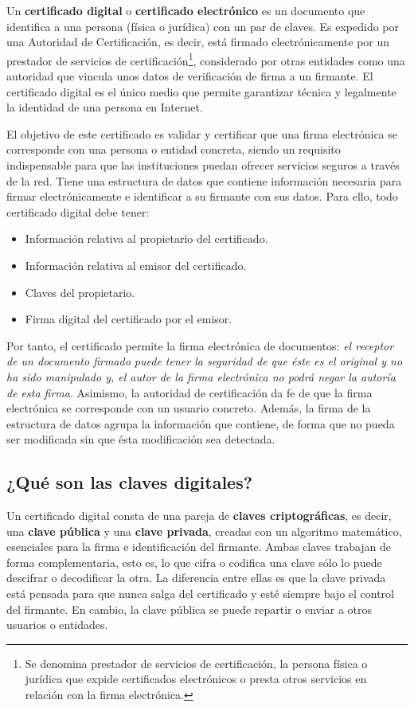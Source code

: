 \documentclass{manual}
\begin{document}
Un \textbf{certificado digital} o \textbf{certificado electrónico} es un documento que identifica a una persona (física o jurídica) con un par de claves. Es expedido por una Autoridad de Certificación, es decir, está firmado electrónicamente por un prestador de servicios de certificación\footnote{Se denomina prestador de servicios de certificación, la persona física o jurídica que expide certificados electrónicos o presta otros servicios en relación con la firma electrónica.}, considerado por otras entidades como una autoridad que vincula unos datos de verificación de firma a un firmante. El certificado digital es el único medio que permite garantizar técnica y legalmente la identidad de una persona en Internet. 

El objetivo de este certificado es validar y certificar que una firma electrónica se corresponde con una persona o entidad concreta, siendo un requisito indispensable para que las instituciones puedan ofrecer servicios seguros a través de la red. Tiene una estructura de datos que contiene información necesaria para firmar electrónicamente e identificar a su firmante con sus datos. Para ello, todo certificado digital debe tener:

\begin{itemize}
	\item Información relativa al propietario del certificado. 
	\item Información relativa al emisor del certificado.
	\item Claves del propietario.
	\item Firma digital del certificado por el emisor.
\end{itemize}

Por tanto, el certificado permite la firma electrónica de documentos: \textit{el receptor de un documento firmado puede tener la seguridad de que éste es el original y no ha sido manipulado y, el autor de la firma electrónica no podrá negar la autoría de esta firma}. Asimismo, la autoridad de certificación da fe de que la firma electrónica se corresponde con un usuario concreto. Además, la firma de la estructura de datos agrupa la información que contiene, de forma que no pueda ser modificada sin que ésta modificación sea detectada.

\subsection{¿Qué son las claves digitales?}

Un certificado digital consta de una pareja de \textbf{claves criptográficas}, es decir, una \textbf{clave pública} y una \textbf{clave privada}, creadas con un algoritmo matemático, esenciales para la firma e identificación del firmante. Ambas claves trabajan de forma complementaria, esto es, lo que cifra o codifica una clave sólo lo puede descifrar o decodificar la otra. La diferencia entre ellas es que la clave privada está pensada para que nunca salga del certificado y esté siempre bajo el control del firmante. En cambio, la clave pública se puede repartir o enviar a otros usuarios o entidades. 
\end{document}
